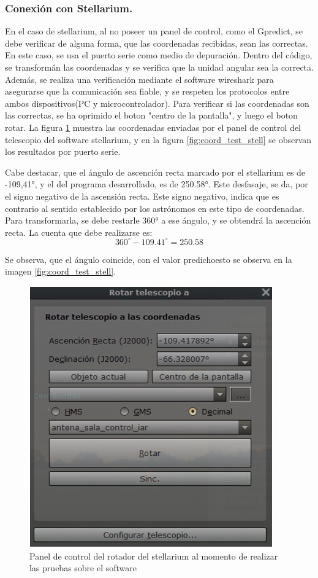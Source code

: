 \subsubsection{Conexión con Stellarium.} 

En el caso de stellarium, al no poseer un panel de control, como el Gpredict, se debe verificar de alguna forma, que las coordenadas recibidas, sean las correctas. En este caso, se usa el puerto serie como medio de depuración. Dentro del código, se transformán las coordenadas y se verifica que la unidad angular sea la correcta. Además, se realiza una verificación mediante el software wireshark para asegurarse que la comunicación sea fiable, y se respeten los protocolos entre ambos dispositivos(PC y microcontrolador).
Para verificar si las coordenadas son las correctas, se ha oprimido el boton "centro de la pantalla", y luego el boton rotar. La figura \ref{fig:rotador_antena_stell_test} muestra las coordenadas enviadas por el panel de control del telescopio del software stellarium, y en la figura \ref{fig:coord_test_stell} se observan los resultados por puerto serie. 

Cabe destacar, que el ángulo de ascención recta marcado por el stellarium es de -109,41°, y el del programa desarrollado, es de 250.58°. Este desfasaje, se da, por el signo negativo de la ascensión recta. Este signo negativo, indica que es contrario al sentido establecido por los astrónomos en este tipo de coordenadas. Para transformarla, se debe restarle 360° a ese ángulo, y se obtendrá la ascención recta. La cuenta que debe realizarse es: 
\begin{equation*}
	360^\circ - 109.41^\circ = 250.58 
\end{equation*}

 Se observa, que el ángulo coincide, con el valor predichoesto se observa en la imagen \ref{fig:coord_test_stell}.  
\begin{figure}[ht!]
	\includegraphics{rotador_antena_stell} 
	\caption{Panel de control del rotador del stellarium al momento de realizar las pruebas sobre el software} 
	\label{fig:rotador_antena_stell_test}
\end{figure}

